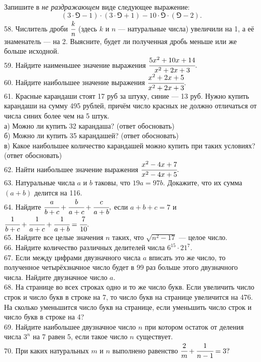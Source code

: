 Запишите в {\it не раздражающем} виде следующее выражение:
$$(3\cdot\Game-1)\cdot(3\cdot\Game+1)-10\cdot\Game\cdot(\Game-2).$$
58. Числитель дроби $\cfrac{k}{n}$ (здесь $k$ и $n$ --- натуральные числа) увеличили на 1, а её знаменатель --- на 2. Выясните, будет ли полученная дробь меньше или же больше исходной.\\
59. Найдите наименьшее значение выражения $\cfrac{5x^2+10x+14}{x^2+2x+3}.$\\
60. Найдите наибольшее значение выражения $\cfrac{x^2+2x+5}{x^2+2x+3}.$\\
61. Красные карандаши стоят 17 руб за штуку, синие --- 13 руб. Нужно купить карандаши на сумму 495 рублей, причём число красных не должно отличаться от числа синих более чем на 5 штук.\\
а) Можно ли купить 32 карандаша? (ответ обосновать)\\
б) Можно ли купить 35 карандашей? (ответ обосновать)\\
в) Какое наибольшее количество карандашей можно купить при таких условиях? (ответ обосновать)\\
62. Найти наибольшее значение выражения $\cfrac{x^2-4x+7}{x^2-4x+5}.$\\
63. Натуральные числа $a$ и $b$ таковы, что $19a=97b.$ Докажите, что их сумма $(a+b)$ делится на 116.\\
64. Найдите $\cfrac{a}{b+c}+\cfrac{b}{a+c}+\cfrac{c}{a+b},$ если $a+b+c=7$ и $\cfrac{1}{b+c}+\cfrac{1}{a+c}+\cfrac{1}{a+b}=\cfrac{7}{10}.$\\
65. Найдите все целые значения $n$ таких, что $\sqrt{n^2-17}$ --- целое число.\\
66. Найдите количество различных делителей числа $6^{15}\cdot21^{7}.$\\
67. Если между цифрами двузначного числа $a$ вписать это же число, то полученное четырёхзначное число будет в 99 раз больше этого двузначного числа. Найдите двузначное число $a.$\\
68. На странице во всех строках одно и то же число букв. Если увеличить число строк и число букв в строке на 7, то число букв на странице увеличится на 476. На сколько уменьшится число букв на странице, если уменьшить число строк и число букв в строке на 4?\\
69. Найдите наибольшее двузначное число $n$ при котором остаток от деления числа $3^n$ на 7 равен 5, если такое число $n$ существует.\\
70. При каких натуральных $m$ и $n$ выполнено равенство $\cfrac{2}{m}+\cfrac{1}{n-1}=3?$\\
